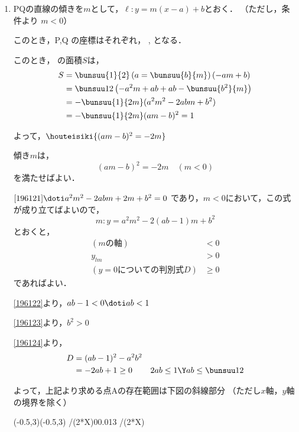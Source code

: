 \begin{enumerate}
    \item PQの直線の傾きを$m$として，$\ell :y = m(x-a) + b$とおく．
    （ただし，条件より $m<0$）

    このとき，P,Q の座標はそれぞれ，
    ,
    となる．

    このとき， の面積$S$は，
    \begin{align*}
        S &= \bunsuu{1}{2}\left(a = \bunsuu{b}{m}\right)(-am + b)\\
        &=\bunsuu12 \left(-a^2m + ab + ab - \bunsuu{b^2}{m}\right)\\
        &=-\bunsuu{1}{2m} (a^2m^2-2abm+b^2)\\
        &=-\bunsuu{1}{2m} (am-b)^2 = 1
    \end{align*}

    よって，$\houteisiki{(am-b)^2=-2m} \label{196121}$

    傾き$m$は，
    \[(am-b)^2 = -2m \quad (m<0)\]
    を満たせばよい．

    $\eqref{196121} \doti a^2m^2-2abm+2m+b^2 = 0$\quad
    であり，$m<0$において，この式が成り立てばよいので，
    \[m:y=a^2m^2-2(ab-1)m + b^2\]
    とおくと，
    \begin{align}
        (mの軸) &< 0 \label{196122}\\
        y_{lm} &> 0 \label{196123}\\
        (y = 0 についての判別式D) &\geq 0 \label{196124}
    \end{align}
    であればよい．

    \eqref{196122}より，$ab-1<0 \doti ab < 1$

    \eqref{196123}より，$b^2 > 0$

    \eqref{196124}より，
    \begin{align*}
        D &= (ab-1)^2-a^2b^2\\
        &=-2ab + 1\geq 0
        &2ab \leq 1 \Y ab \leq \bunsuu12
    \end{align*}

    よって，上記より求める点Aの存在範囲は下図の斜線部分
    （ただし$x$軸，$y$軸の境界を除く）

    \begin{center}
        \begin{pszahyou}[ul=12mm](-0.5,3)(-0.5,3)
            \def\Fx{1/(2*X)}
            \def\Gx{0}
            \YNurii*\Fx\Gx{0.01}{3}
            \YGurafu*\Fx
        \end{pszahyou}
    \end{center}
    \KOTAE



\end{enumerate}
